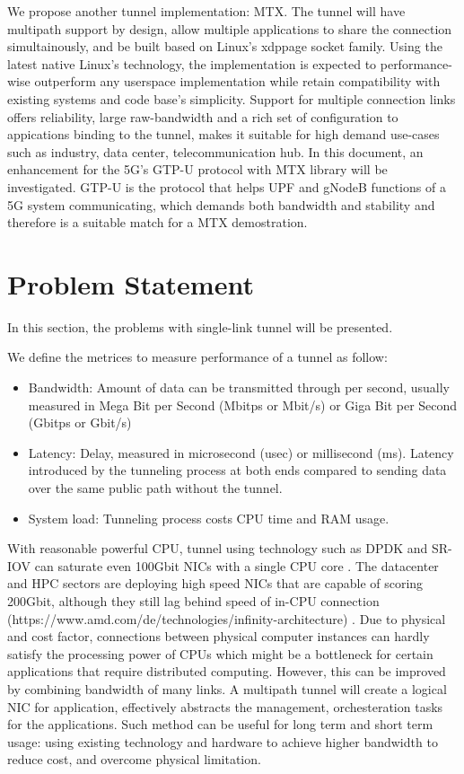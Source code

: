 We propose another tunnel implementation: \ac{MTX}. 
The tunnel will have multipath support by design, allow multiple applications to share the connection simultainously, and be built based on Linux's \ac{xdppage} socket family.
Using the latest native Linux's technology, the implementation is expected to performance-wise outperform any userspace implementation while retain compatibility with existing systems and code base's simplicity. 
Support for multiple connection links offers reliability, large raw-bandwidth and a rich set of configuration to appications binding to the tunnel, makes it suitable for high demand use-cases such as industry, data center, telecommunication hub. 
In this document, an enhancement for the 5G's GTP-U protocol with \ac{MTX} library will be investigated. GTP-U is the protocol that helps UPF and gNodeB functions of a 5G system communicating, which demands both bandwidth and stability and therefore is a suitable match for a \ac{MTX} demostration.


\section{Problem Statement}
In this section, the problems with single-link tunnel will be presented.

We define the metrices to measure performance of a tunnel as follow:
\begin{itemize}
    \item Bandwidth: Amount of data can be transmitted through per second, usually measured in Mega Bit per Second (Mbitps or Mbit/s) or Giga Bit per Second (Gbitps or Gbit/s)
    \item Latency: Delay, measured in microsecond (usec) or millisecond (ms). Latency introduced by the tunneling process at both ends compared to sending data over the same public path without the tunnel.
    \item System load: Tunneling process costs CPU time and RAM usage.
\end{itemize}

With reasonable powerful CPU, tunnel using technology such as DPDK and SR-IOV can saturate even 100Gbit NICs with a single CPU core . 
The datacenter and HPC sectors are deploying high speed NICs that are capable of scoring 200Gbit, although they still lag behind speed of in-CPU connection (https://www.amd.com/de/technologies/infinity-architecture) .
Due to physical and cost factor, connections between physical computer instances can hardly satisfy the processing power of CPUs  which might be a bottleneck for certain applications that require distributed computing.
However, this can be improved by combining bandwidth of many links. 
A multipath tunnel will create a logical NIC for application, effectively abstracts the management, orchesteration tasks for the applications.
Such method can be useful for long term and short term usage: using existing technology and hardware to achieve higher bandwidth to reduce cost, and overcome physical limitation.

